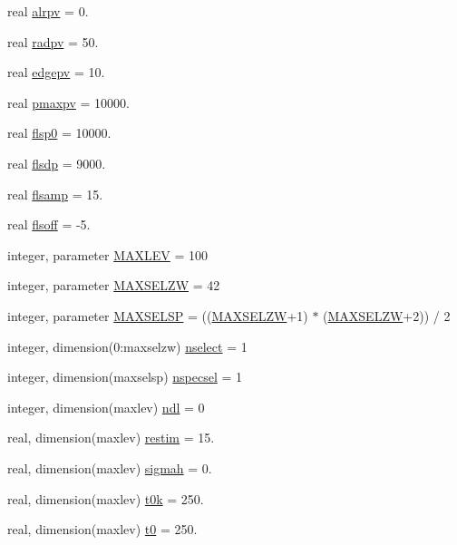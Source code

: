 \begin{DoxyCompactItemize}
real \hyperlink{classpumamod_aaf1e5289f2d9067fb27ac9ac6a07e554}{alrpv} = 0.
\item 
real \hyperlink{classpumamod_a3d7cf5223d98e0c95a4377560f9aac6c}{radpv} = 50.
\item 
real \hyperlink{classpumamod_a69b908f8d7731d272c19d329fcd33706}{edgepv} = 10.
\item 
real \hyperlink{classpumamod_a7171bac7e6ef17b935eac4171b1149ff}{pmaxpv} = 10000.
\item 
real \hyperlink{classpumamod_a13482db37c1abe130d4dc4af706bbfcd}{flsp0} = 10000.
\item 
real \hyperlink{classpumamod_a51e58c7fbc975478f8dbe96463b3a433}{flsdp} = 9000.
\item 
real \hyperlink{classpumamod_a3989013e6e41db4fe84fe588114e3298}{flsamp} = 15.
\item 
real \hyperlink{classpumamod_a2a580be12b22eb35c66b88168ad41a5a}{flsoff} = -\/5.
\item 
integer, parameter \hyperlink{classpumamod_a80d5840e4839b80e13a754bc1ad9e5cd}{\-M\-A\-X\-L\-E\-V} = 100
\item 
integer, parameter \hyperlink{classpumamod_ab32dffe308b27471e38da867575f6811}{\-M\-A\-X\-S\-E\-L\-Z\-W} = 42
\item 
integer, parameter \hyperlink{classpumamod_a9d128654f0c25001f195e33b7a28029d}{\-M\-A\-X\-S\-E\-L\-S\-P} = ((\hyperlink{classpumamod_ab32dffe308b27471e38da867575f6811}{\-M\-A\-X\-S\-E\-L\-Z\-W}+1) $\ast$ (\hyperlink{classpumamod_ab32dffe308b27471e38da867575f6811}{\-M\-A\-X\-S\-E\-L\-Z\-W}+2)) / 2
\item 
integer, dimension(0\-:maxselzw) \hyperlink{classpumamod_af4ef7f7d21aa9c3043e4efaa1a0b0c3e}{nselect} = 1
\item 
integer, dimension(maxselsp) \hyperlink{classpumamod_a2c894b8fdb5ec54ea52d347187671e2c}{nspecsel} = 1
\item 
integer, dimension(maxlev) \hyperlink{classpumamod_a15b0384953f7f10aa3e03dee7662e0f3}{ndl} = 0
\item 
real, dimension(maxlev) \hyperlink{classpumamod_a89c938c5067b7da4825d70342cc62fc5}{restim} = 15.
\item 
real, dimension(maxlev) \hyperlink{classpumamod_a0fe6c7d70c84c4134653d23d7ba1f542}{sigmah} = 0.
\item 
real, dimension(maxlev) \hyperlink{classpumamod_a15be485545b52c4c0fa534fe17e9408b}{t0k} = 250.
\item 
real, dimension(maxlev) \hyperlink{classpumamod_aaa502cf0bf055e6a77058cb9a894c808}{t0} = 250.

\end{DoxyCompactItemize}
